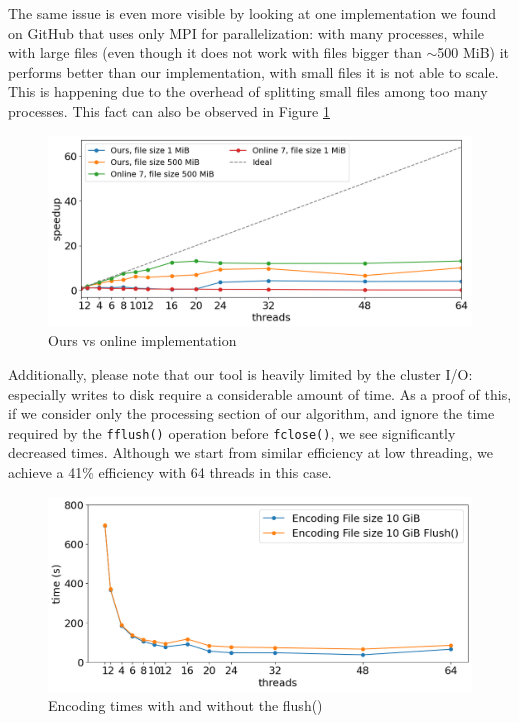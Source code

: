 The same issue is even more visible by looking at one implementation we found on GitHub that uses only MPI for parallelization\cite{HuffmanCodingMPICUDA}: with many processes, while with large files (even though it does not work with files bigger than $\sim$500 MiB) it performs better than our implementation, with small files it is not able to scale. This is happening due to the overhead of splitting small files among too many processes. This fact can also be observed in Figure \ref{fig:ours-vs-online}
\begin{figure}
	\centering
	\includegraphics[width=1\linewidth]{"../imgs/our vs online 7"}
	\caption{Ours vs online implementation}
	\label{fig:ours-vs-online}
\end{figure}
Additionally, please note that our tool is heavily limited by the cluster I/O: especially writes to disk require a considerable amount of time. As a proof of this, if we consider only the processing section of our algorithm, and ignore the time required by the \verb|fflush()| operation before \verb|fclose()|, we see significantly decreased times. Although we start from similar efficiency at low threading, we achieve a 41\% efficiency with 64 threads in this case. %

\begin{figure}
	\centering
	\includegraphics[width=1\linewidth]{"../imgs/Flush vs non Flush"}
	\caption{Encoding times with and without the flush()}
	\label{fig:flush-vs-non-flush}
\end{figure}

